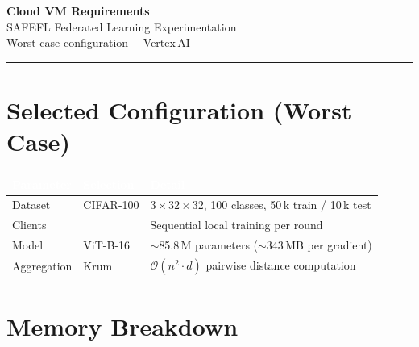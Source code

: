\documentclass[11pt,a4paper]{article}
\newcommand{\sectionrule}{\noindent\textcolor{hdrblue}{\rule{\linewidth}{0.6pt}}\vspace{4pt}}
\begin{document}
\begin{center}
  {\LARGE\bfseries\textcolor{hdrblue}{Cloud VM Requirements}}\\[4pt]
  {\large SAFEFL Federated Learning Experimentation}\\[2pt]
  {\small Worst-case configuration\,---\,Vertex\,AI}
\end{center}
\sectionrule

\section*{Selected Configuration (Worst Case)}

\noindent
\begin{center}
\renewcommand{\arraystretch}{1.3}
\begin{tabular}{
  >{\raggedright\arraybackslash}p{3.8cm}
  >{\raggedright\arraybackslash}p{4.2cm}
  >{\raggedright\arraybackslash}p{6.5cm}}
\toprule
\rowcolor{hdrblue}
\textcolor{white}{\textbf{Parameter}} &
\textcolor{white}{\textbf{Selection}} &
\textcolor{white}{\textbf{Detail}} \\
\midrule
Dataset        & CIFAR-100       & $3\times32\times32$, 100 classes, 50\,k train / 10\,k test \\
\rowcolor{rowgray}
Clients        & 500             & Sequential local training per round \\
Model          & ViT-B-16        & $\sim$85.8\,M parameters ($\sim$343\,MB per gradient) \\
\rowcolor{rowgray}
Aggregation    & Krum            & $\mathcal{O}(n^{2}\!\cdot\!d)$ pairwise distance computation \\
\bottomrule
\end{tabular}
\end{center}

\section*{Memory Breakdown}
\end{document}
